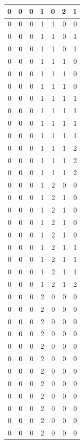 \documentclass[
  12pt,
]{krantz}
\begin{document}
\begin{tabular}{r|r|r|r|r|r|r}
\hline
0 & 0 & 0 & 1 & 0 & 2 & 1\\
\hline
0 & 0 & 0 & 1 & 1 & 0 & 0\\
\hline
0 & 0 & 0 & 1 & 1 & 0 & 1\\
\hline
0 & 0 & 0 & 1 & 1 & 0 & 1\\
\hline
0 & 0 & 0 & 1 & 1 & 1 & 0\\
\hline
0 & 0 & 0 & 1 & 1 & 1 & 0\\
\hline
0 & 0 & 0 & 1 & 1 & 1 & 0\\
\hline
0 & 0 & 0 & 1 & 1 & 1 & 1\\
\hline
0 & 0 & 0 & 1 & 1 & 1 & 1\\
\hline
0 & 0 & 0 & 1 & 1 & 1 & 1\\
\hline
0 & 0 & 0 & 1 & 1 & 1 & 1\\
\hline
0 & 0 & 0 & 1 & 1 & 1 & 2\\
\hline
0 & 0 & 0 & 1 & 1 & 1 & 2\\
\hline
0 & 0 & 0 & 1 & 1 & 1 & 2\\
\hline
0 & 0 & 0 & 1 & 2 & 0 & 0\\
\hline
0 & 0 & 0 & 1 & 2 & 1 & 0\\
\hline
0 & 0 & 0 & 1 & 2 & 1 & 0\\
\hline
0 & 0 & 0 & 1 & 2 & 1 & 0\\
\hline
0 & 0 & 0 & 1 & 2 & 1 & 0\\
\hline
0 & 0 & 0 & 1 & 2 & 1 & 1\\
\hline
0 & 0 & 0 & 1 & 2 & 1 & 1\\
\hline
0 & 0 & 0 & 1 & 2 & 1 & 1\\
\hline
0 & 0 & 0 & 1 & 2 & 1 & 2\\
\hline
0 & 0 & 0 & 2 & 0 & 0 & 0\\
\hline
0 & 0 & 0 & 2 & 0 & 0 & 0\\
\hline
0 & 0 & 0 & 2 & 0 & 0 & 0\\
\hline
0 & 0 & 0 & 2 & 0 & 0 & 0\\
\hline
0 & 0 & 0 & 2 & 0 & 0 & 0\\
\hline
0 & 0 & 0 & 2 & 0 & 0 & 0\\
\hline
0 & 0 & 0 & 2 & 0 & 0 & 0\\
\hline
0 & 0 & 0 & 2 & 0 & 0 & 0\\
\hline
0 & 0 & 0 & 2 & 0 & 0 & 0\\
\hline
0 & 0 & 0 & 2 & 0 & 0 & 0\\
\hline
0 & 0 & 0 & 2 & 0 & 0 & 0\\
\hline
0 & 0 & 0 & 2 & 0 & 0 & 0\\

\end{tabular}
\end{document}
